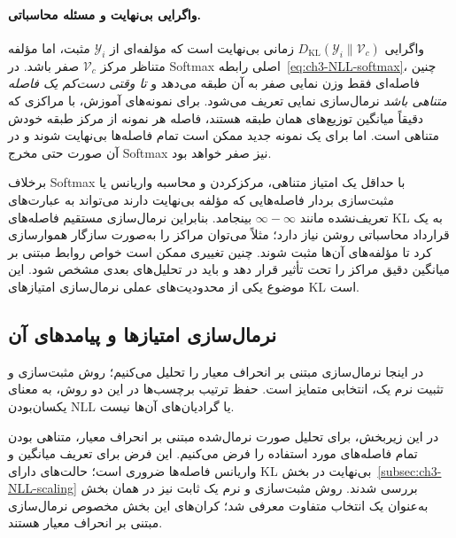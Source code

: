 \paragraph{واگرایی بی‌نهایت و مسئله محاسباتی.}
واگرایی $D_{\mathrm{KL}}(\mathscr Y_i\|\mathcal V_c)$ زمانی بی‌نهایت است که مؤلفه‌ای از $\mathscr Y_i$ مثبت، اما مؤلفه متناظر مرکز $\mathcal V_c$ صفر باشد. در Softmax اصلی رابطه~\eqref{eq:ch3-NLL-softmax}، چنین فاصله‌ای فقط وزن نمایی صفر به آن طبقه می‌دهد و \emph{تا وقتی دست‌کم یک فاصله متناهی باشد} نرمال‌سازی نمایی تعریف می‌شود. برای نمونه‌های آموزش، با مراکزی که دقیقاً میانگین توزیع‌های همان طبقه هستند، فاصله هر نمونه از مرکز طبقه خودش متناهی است. اما برای یک نمونه جدید ممکن است تمام فاصله‌ها بی‌نهایت شوند و در آن صورت حتی مخرج Softmax نیز صفر خواهد بود.

برخلاف Softmax با حداقل یک امتیاز متناهی، مرکزکردن و محاسبه واریانس یا مثبت‌سازی بردار فاصله‌هایی که مؤلفه بی‌نهایت دارند می‌تواند به عبارت‌های تعریف‌نشده مانند $\infty-\infty$ بینجامد. بنابراین نرمال‌سازی مستقیم فاصله‌های KL به یک قرارداد محاسباتی روشن نیاز دارد؛ مثلاً می‌توان مراکز را به‌صورت سازگار هموارسازی کرد تا مؤلفه‌های آن‌ها مثبت شوند. چنین تغییری ممکن است خواص روابط مبتنی بر میانگین دقیق مراکز را تحت تأثیر قرار دهد و باید در تحلیل‌های بعدی مشخص شود. این موضوع یکی از محدودیت‌های عملی نرمال‌سازی امتیازهای KL است.


\subsection{نرمال‌سازی امتیازها و پیامدهای آن}
\label{subsec:ch3-normalized-NLL}

در اینجا نرمال‌سازی مبتنی بر انحراف معیار
را تحلیل می‌کنیم؛ روش مثبت‌سازی و تثبیت نرم یک،
انتخابی متمایز است. حفظ ترتیب برچسب‌ها
در این دو روش، به معنای یکسان‌بودن NLL
یا گرادیان‌های آن‌ها نیست.

در این زیربخش، برای تحلیل صورت نرمال‌شده مبتنی بر انحراف معیار، متناهی بودن تمام فاصله‌های مورد استفاده را فرض می‌کنیم. این فرض برای تعریف میانگین و واریانس فاصله‌ها ضروری است؛ حالت‌های دارای KL بی‌نهایت در بخش~\ref{subsec:ch3-NLL-scaling} بررسی شدند. روش مثبت‌سازی و نرم یک ثابت نیز در همان بخش به‌عنوان یک انتخاب متفاوت معرفی شد؛ کران‌های این بخش مخصوص نرمال‌سازی مبتنی بر انحراف معیار هستند.

